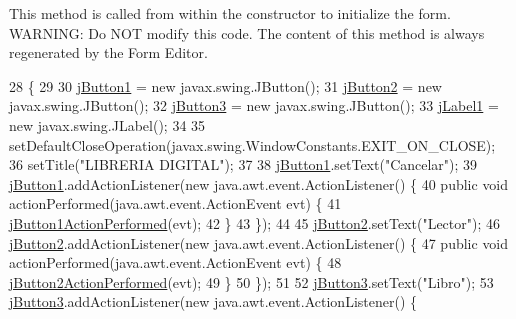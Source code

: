 This method is called from within the constructor to initialize the form. W\+A\+R\+N\+I\+NG\+: Do N\+OT modify this code. The content of this method is always regenerated by the Form Editor. 
\begin{DoxyCode}
28                                   \{
29 
30         \mbox{\hyperlink{class_interfaz_package_1_1_interfaz_baja_a12d3d95e2abdc0965a784087da80b5e0}{jButton1}} = \textcolor{keyword}{new} javax.swing.JButton();
31         \mbox{\hyperlink{class_interfaz_package_1_1_interfaz_baja_ab8ddc56f0ab1aa53f4e8e0f6724b1c98}{jButton2}} = \textcolor{keyword}{new} javax.swing.JButton();
32         \mbox{\hyperlink{class_interfaz_package_1_1_interfaz_baja_aacfa87c1b80522aa3156f4e63a3fda84}{jButton3}} = \textcolor{keyword}{new} javax.swing.JButton();
33         \mbox{\hyperlink{class_interfaz_package_1_1_interfaz_baja_a145dfd99a3540638ebf1c737eae819e0}{jLabel1}} = \textcolor{keyword}{new} javax.swing.JLabel();
34 
35         setDefaultCloseOperation(javax.swing.WindowConstants.EXIT\_ON\_CLOSE);
36         setTitle(\textcolor{stringliteral}{"LIBRERIA DIGITAL"});
37 
38         \mbox{\hyperlink{class_interfaz_package_1_1_interfaz_baja_a12d3d95e2abdc0965a784087da80b5e0}{jButton1}}.setText(\textcolor{stringliteral}{"Cancelar"});
39         \mbox{\hyperlink{class_interfaz_package_1_1_interfaz_baja_a12d3d95e2abdc0965a784087da80b5e0}{jButton1}}.addActionListener(\textcolor{keyword}{new} java.awt.event.ActionListener() \{
40             \textcolor{keyword}{public} \textcolor{keywordtype}{void} actionPerformed(java.awt.event.ActionEvent evt) \{
41                 \mbox{\hyperlink{class_interfaz_package_1_1_interfaz_baja_a7e419e5352b3abfcf7466743857e6311}{jButton1ActionPerformed}}(evt);
42             \}
43         \});
44 
45         \mbox{\hyperlink{class_interfaz_package_1_1_interfaz_baja_ab8ddc56f0ab1aa53f4e8e0f6724b1c98}{jButton2}}.setText(\textcolor{stringliteral}{"Lector"});
46         \mbox{\hyperlink{class_interfaz_package_1_1_interfaz_baja_ab8ddc56f0ab1aa53f4e8e0f6724b1c98}{jButton2}}.addActionListener(\textcolor{keyword}{new} java.awt.event.ActionListener() \{
47             \textcolor{keyword}{public} \textcolor{keywordtype}{void} actionPerformed(java.awt.event.ActionEvent evt) \{
48                 \mbox{\hyperlink{class_interfaz_package_1_1_interfaz_baja_a940a0e0837cd07847853eff8fa207834}{jButton2ActionPerformed}}(evt);
49             \}
50         \});
51 
52         \mbox{\hyperlink{class_interfaz_package_1_1_interfaz_baja_aacfa87c1b80522aa3156f4e63a3fda84}{jButton3}}.setText(\textcolor{stringliteral}{"Libro"});
53         \mbox{\hyperlink{class_interfaz_package_1_1_interfaz_baja_aacfa87c1b80522aa3156f4e63a3fda84}{jButton3}}.addActionListener(\textcolor{keyword}{new} java.awt.event.ActionListener() \{

\end{DoxyCode}
